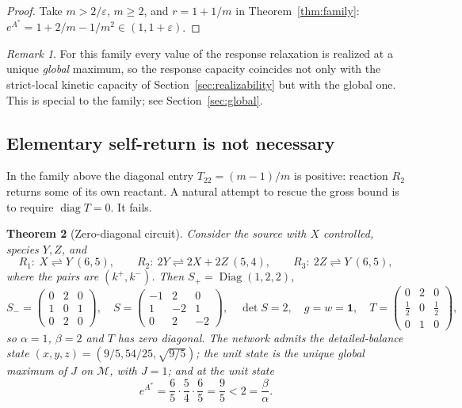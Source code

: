 \documentclass[11pt,reqno]{amsart}
\theoremstyle{plain}
\newtheorem{theorem}{Theorem}[section]
\theoremstyle{definition}
\theoremstyle{remark}
\newtheorem{remark}[theorem]{Remark}
\numberwithin{equation}{section}
\newcommand{\one}{\mathbf{1}}
\newcommand{\Diag}{\operatorname{Diag}}
\newcommand{\Sp}{S_{+}}
\newcommand{\Sm}{S_{-}}
\begin{document}
\begin{proof}
Take $m>2/\varepsilon$, $m\ge2$, and $r=1+1/m$ in Theorem~\ref{thm:family}: $e^{A^*}=1+2/m-1/m^2\in(1,1+\varepsilon)$.
\end{proof}

\begin{remark}
For this family every value of the response relaxation is realized at a unique \emph{global} maximum, so the response capacity coincides not only with the strict-local kinetic capacity of Section~\ref{sec:realizability} but with the global one.  This is special to the family; see Section~\ref{sec:global}.
\end{remark}

\subsection{Elementary self-return is not necessary}
In the family above the diagonal entry $T_{22}=(m-1)/m$ is positive: reaction $R_2$ returns some of its own reactant.  A natural attempt to rescue the gross bound is to require $\operatorname{diag}T=0$.  It fails.

\begin{theorem}[Zero-diagonal circuit]\label{thm:zerodiag}
Consider the source with $X$ controlled, species $Y,Z$, and
\[
R_1:\ X\rightleftharpoons Y\ (6,5),\qquad R_2:\ 2Y\rightleftharpoons2X+2Z\ (5,4),\qquad R_3:\ 2Z\rightleftharpoons Y\ (6,5),
\]
where the pairs are $(k^+,k^-)$.  Then $\Sp=\Diag(1,2,2)$,
\[
\Sm=\begin{pmatrix}0&2&0\\1&0&1\\0&2&0\end{pmatrix},\quad
S=\begin{pmatrix}-1&2&0\\1&-2&1\\0&2&-2\end{pmatrix},\quad\det S=2,\quad g=w=\one,\quad
T=\begin{pmatrix}0&2&0\\ \tfrac12&0&\tfrac12\\0&1&0\end{pmatrix},
\]
so $\alpha=1$, $\beta=2$ and $T$ has zero diagonal.  The network admits the detailed-balance state $(x,y,z)=(9/5,54/25,\sqrt{9/5})$; the unit state is the unique global maximum of $J$ on $\mathcal M$, with $J=1$; and at the unit state
\[
e^{A^*}=\frac65\cdot\frac54\cdot\frac65=\frac95<2=\frac\beta\alpha .
\]
\end{theorem}
\end{document}
